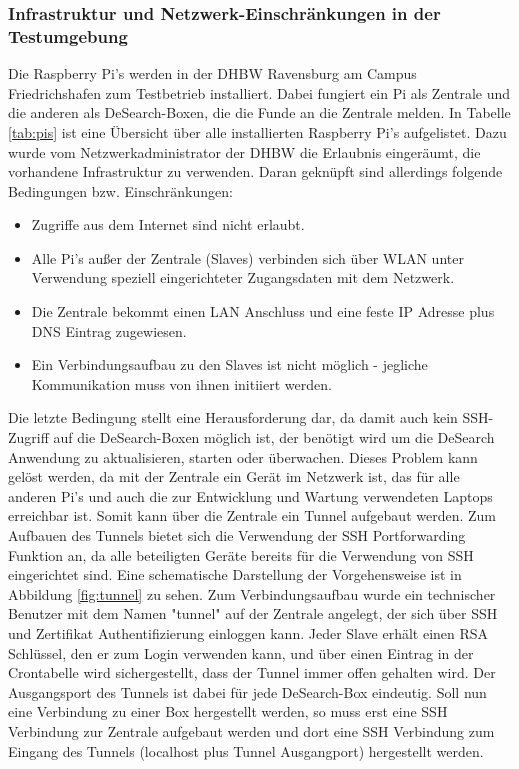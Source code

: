 \subsubsection{Infrastruktur und Netzwerk-Einschränkungen in der Testumgebung}\label{sssec:tunnel}
Die Raspberry Pi's werden in der DHBW Ravensburg am Campus Friedrichshafen zum Testbetrieb installiert. Dabei fungiert ein Pi als Zentrale und die anderen als DeSearch-Boxen, die die Funde an die Zentrale melden. In Tabelle \ref{tab:pis} ist eine Übersicht über alle installierten Raspberry Pi's aufgelistet.
Dazu wurde vom Netzwerkadministrator der DHBW die Erlaubnis eingeräumt, die vorhandene Infrastruktur zu verwenden. Daran geknüpft sind allerdings folgende Bedingungen bzw. Einschränkungen:
\begin{itemize}
	\item Zugriffe aus dem Internet sind nicht erlaubt.
	\item Alle Pi's außer der Zentrale (Slaves) verbinden sich über WLAN unter Verwendung speziell eingerichteter Zugangsdaten mit dem Netzwerk.
	\item Die Zentrale bekommt einen LAN Anschluss und eine feste IP Adresse plus DNS Eintrag zugewiesen.
	\item Ein Verbindungsaufbau zu den Slaves ist nicht möglich - jegliche Kommunikation muss von ihnen initiiert werden.
\end{itemize}
Die letzte Bedingung stellt eine Herausforderung dar, da damit auch kein SSH-Zugriff auf die DeSearch-Boxen möglich ist, der benötigt wird um die DeSearch Anwendung zu aktualisieren, starten oder überwachen.
Dieses Problem kann gelöst werden, da mit der Zentrale ein Gerät im Netzwerk ist, das für alle anderen Pi's und auch die zur Entwicklung und Wartung verwendeten Laptops erreichbar ist. Somit kann über die Zentrale ein Tunnel aufgebaut werden.
Zum Aufbauen des Tunnels bietet sich die Verwendung der SSH Portforwarding Funktion an, da alle beteiligten Geräte bereits für die Verwendung von SSH eingerichtet sind. Eine schematische Darstellung der Vorgehensweise ist in Abbildung \ref{fig:tunnel} zu sehen.
Zum Verbindungsaufbau wurde ein technischer Benutzer mit dem Namen "tunnel" auf der Zentrale angelegt, der sich über SSH und Zertifikat Authentifizierung einloggen kann.
Jeder Slave erhält einen RSA Schlüssel, den er zum Login verwenden kann, und über einen Eintrag in der Crontabelle wird sichergestellt, dass der Tunnel immer offen gehalten wird.
Der Ausgangsport des Tunnels ist dabei für jede DeSearch-Box eindeutig. Soll nun eine Verbindung zu einer Box hergestellt werden, so muss erst eine SSH Verbindung zur Zentrale aufgebaut werden und dort eine SSH Verbindung zum Eingang des Tunnels (localhost plus Tunnel Ausgangport) hergestellt werden.
